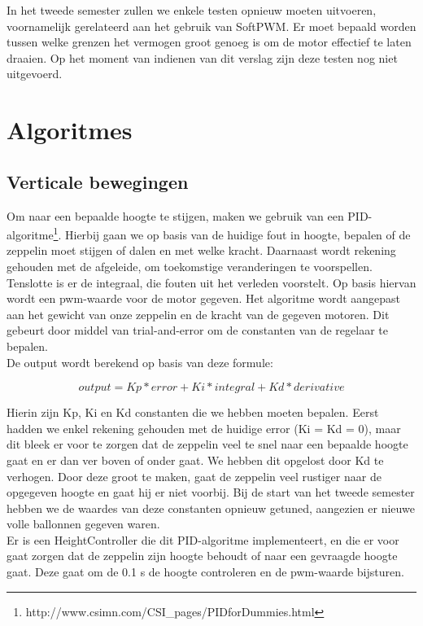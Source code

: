 \documentclass[eind]{penoverslag}
\begin{document}
In het tweede semester zullen we enkele testen opnieuw moeten uitvoeren, voornamelijk gerelateerd aan het gebruik van SoftPWM. Er moet bepaald worden tussen welke grenzen het vermogen groot genoeg is om de motor effectief te laten draaien. Op het moment van indienen van dit verslag zijn deze testen nog niet uitgevoerd.

\section{Algoritmes}
\subsection{Verticale bewegingen}
Om naar een bepaalde hoogte te stijgen, maken we gebruik van een PID-algoritme\footnote{http://www.csimn.com/CSI\_pages/PIDforDummies.html}. Hierbij gaan we op basis van de huidige fout in hoogte, bepalen of de zeppelin moet stijgen of dalen en met welke kracht. Daarnaast wordt rekening gehouden met de afgeleide, om toekomstige veranderingen te voorspellen. Tenslotte is er de integraal, die fouten uit het verleden voorstelt. Op basis hiervan wordt een pwm-waarde voor de motor gegeven. Het algoritme wordt aangepast aan het gewicht van onze zeppelin en de kracht van de gegeven motoren. Dit gebeurt door middel van trial-and-error om de constanten van de regelaar te bepalen.\\
De output wordt berekend op basis van deze formule:

\begin{equation}
 output = Kp*error + Ki*integral + Kd*derivative
\end{equation}

Hierin zijn Kp, Ki en Kd constanten die we hebben moeten bepalen. Eerst hadden we enkel rekening gehouden met de huidige error (Ki = Kd = 0), maar dit bleek er voor te zorgen dat de zeppelin veel te snel naar een bepaalde hoogte gaat en er dan ver boven of onder gaat. We hebben dit opgelost door Kd te verhogen. Door deze groot te maken, gaat de zeppelin veel rustiger naar de opgegeven hoogte en gaat hij er niet voorbij. Bij de start van het tweede semester hebben we de waardes van deze constanten opnieuw getuned, aangezien er nieuwe volle ballonnen gegeven waren. \\

Er is een HeightController die dit PID-algoritme implementeert, en die er voor gaat zorgen dat de zeppelin zijn hoogte behoudt of naar een gevraagde hoogte gaat. Deze gaat om de 0.1 s de hoogte controleren en de pwm-waarde bijsturen. \\
\end{document}
